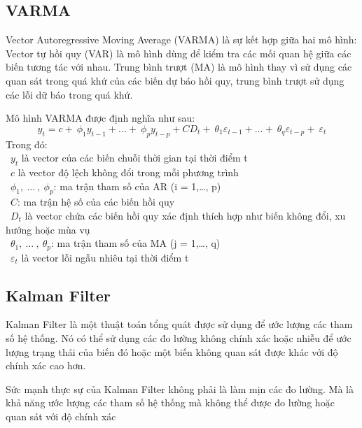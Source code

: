 \subsection{VARMA}
Vector Autoregressive Moving Average (VARMA) là sự kết hợp giữa hai mô hình: Vector tự hồi quy (VAR) là mô hình dùng để kiểm tra các mối quan hệ giữa các biến tương tác với nhau. Trung bình trượt (MA) là mô hình thay vì sử dụng các quan sát trong quá khứ của các biến dự báo hồi quy, trung bình trượt sử dụng các lỗi dữ báo trong quá khứ. 
\par
Mô hình VARMA được định nghĩa như sau:
\[y_{t} = c + \ \phi_{1}y_{t - 1} + \ldots + \ \phi_{p}y_{t - p} + CD_{t} + \ \theta_{1}\varepsilon_{t - 1} + \ldots + \ \theta_{q}\varepsilon_{t - p} + \ \varepsilon_{t}\]
Trong đó:\\
    \indent\textbullet\ \(y_{t}\) là vector của các biến chuỗi thời gian tại thời điểm t\\
    \indent\textbullet\ \(c\) là vector độ lệch không đổi trong mỗi phương trình\\
    \indent\textbullet\ \(\phi_{1},\ \ldots\ ,\ \phi_{p}\): ma trận tham số của AR (i = 1,…, p)\\
    \indent\textbullet\ \(C\): ma trận hệ số của các biến hồi quy\\
    \indent\textbullet\ \(D_{t}\) là vector chứa các biến hồi quy xác định thích hợp như biến không đổi, xu hướng hoặc mùa vụ\\
    \indent\textbullet\ \(\theta_{1},\ \ldots\ ,\ \theta_{p}\): ma trận tham số của MA (j = 1,…, q)\\
    \indent\textbullet\ \(\varepsilon_{t}\) là vector lỗi ngẫu nhiêu tại thời điểm t
\subsection{Kalman Filter}
Kalman Filter là một thuật toán tổng quát được sử dụng để ước lượng các tham số hệ thống. Nó có thể sử dụng các đo lường không chính xác hoặc nhiễu để ước lượng trạng thái của biến đó hoặc một biến không quan sát được khác với độ chính xác cao hơn.

Sức mạnh thực sự của Kalman Filter không phải là làm mịn các đo lường. Mà là khả năng ước lượng các tham số hệ thống mà không thể được đo lường hoặc quan sát với độ chính xác\\

